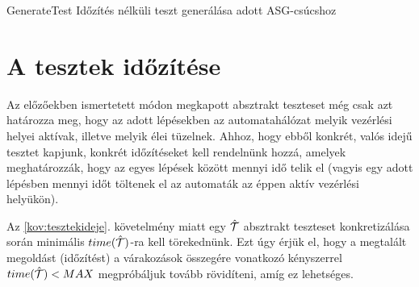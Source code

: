 \begin{algorithm}[t]
\DontPrintSemicolon
\caption{{\sc GenerateTest} Időzítés nélküli teszt generálása adott ASG-csúcshoz} \label{GenerateTest}

\end{algorithm}

\section{A tesztek időzítése} \label{teszt-idozites}

Az előzőekben ismertetett módon megkapott absztrakt teszteset még csak azt határozza meg, hogy az adott lépésekben az automatahálózat melyik vezérlési helyei aktívak, illetve melyik élei tüzelnek. Ahhoz, hogy ebből konkrét, valós idejű tesztet kapjunk, konkrét időzítéseket kell rendelnünk hozzá, amelyek meghatározzák, hogy az egyes lépések között mennyi idő telik el (vagyis egy adott lépésben mennyi időt töltenek el az automaták az éppen aktív vezérlési helyükön).

Az \ref{kov:tesztekideje}. követelmény miatt egy $\hat{\mathcal{T}}$ absztrakt teszteset konkretizálása során minimális $time(\hat{\mathcal{T}})$-ra kell törekednünk. Ezt úgy érjük el, hogy a megtalált megoldást (időzítést) a várakozások összegére vonatkozó kényszerrel $time(\hat{\mathcal{T}}) < MAX$ megpróbáljuk tovább rövidíteni, amíg ez lehetséges.

